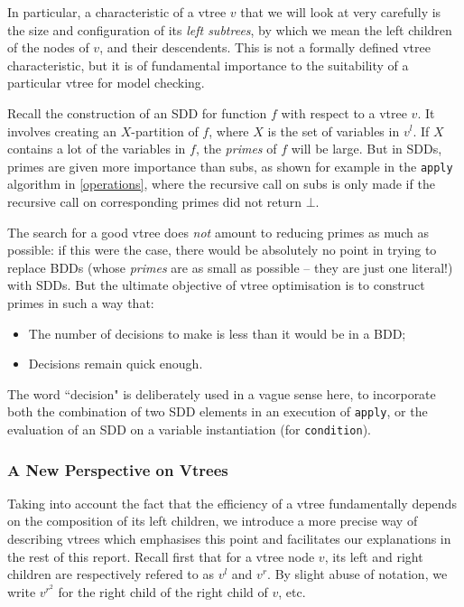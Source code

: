 \documentclass[11pt]{article}
\begin{document}
In particular, a characteristic of a vtree $v$ that we will look at very carefully is the size and configuration of its \textit{left subtrees}, by which we mean the left children of the nodes of $v$, and their descendents.	This is not a formally defined vtree characteristic, but it is of fundamental importance to the suitability of a particular vtree for model checking. 

Recall the construction of an SDD for function $f$ with respect to a vtree $v$. It involves creating an $X$-partition of $f$, where $X$ is the set of variables in $v^l$. If $X$ contains a lot of the variables in $f$, the \textit{primes} of $f$ will be large. But in SDDs, primes are given more importance than subs, as shown for example in the \texttt{apply} algorithm in \ref{operations}, where the recursive call on subs is only made if the recursive call on corresponding primes did not return $\bot$.

The search for a good vtree does \textit{not }amount to reducing primes as much as possible: if this were the case, there would be absolutely no point in trying to replace BDDs (whose \textit{primes} are as small as possible -- they are just one literal!) with SDDs. But the ultimate objective of vtree optimisation is to construct primes in such a way that: \begin{itemize}
\item The number of decisions to make is less than it would be in a BDD;
\item Decisions remain quick enough.
\end{itemize}
The word ``decision" is deliberately used in a vague sense here, to incorporate both the combination of two SDD elements in an execution of \texttt{apply}, or the evaluation of an SDD on a variable instantiation (for \texttt{condition}).

\subsubsection{A New Perspective on Vtrees}
\label{new_perspective}
Taking into account the fact that the efficiency of a vtree fundamentally depends on the composition of its left children, we introduce a more precise way of describing vtrees which emphasises this point and facilitates our explanations in the rest of this report. Recall first that for a vtree node $v$, its left and right children are respectively refered to as $v^l$ and $v^r$. By slight abuse of notation, we write $v^{r^2}$ for the right child of the right child of $v$, etc.
\end{document}
